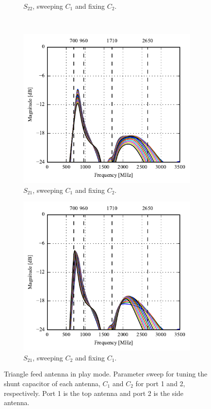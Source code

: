 \begin{figure}[htbp]
\begin{subfigure}[b]{0.49\linewidth}
        \caption{$S_{22}$, sweeping $C_1$ and fixing $C_2$.}
    \end{subfigure}
    \\
    \begin{subfigure}[b]{0.49\linewidth}
        \centering
        \includegraphics{img/tech_sol/trianglefeed/play_mode/Csh1s21.pdf}
        \caption{$S_{21}$, sweeping $C_1$ and fixing $C_2$.}
    \end{subfigure}
    \hfill
    \begin{subfigure}[b]{0.49\linewidth}
        \centering
        \includegraphics{img/tech_sol/trianglefeed/play_mode/Csh2s21.pdf}
        \caption{$S_{21}$, sweeping $C_2$ and fixing $C_1$.}
    \end{subfigure}
    \caption{Triangle feed antenna in play mode. Parameter sweep for tuning the shunt capacitor of each antenna, $C_1$ and $C_2$ for port 1 and 2, respectively. Port 1 is the top antenna and port 2 is the side antenna.}
    \label{fig:tiang_sparam_sweep_play}
\end{figure}

